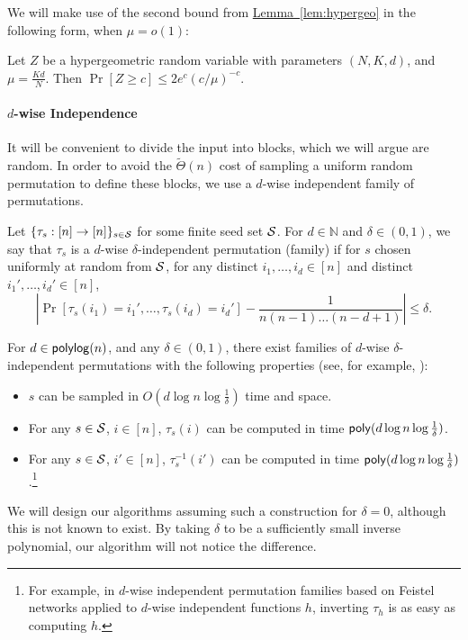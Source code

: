 \documentclass{theoretics}
\newcommand{\lem}[1]{\hyperref[lem:#1]{Lemma~\ref*{lem:#1}}}
\renewcommand{\>}{\rangle}
\newcommand{\<}{\langle}
\renewcommand{\(}{\left(}
\renewcommand{\)}{\right)}
\def\abs#1{\left| #1 \right|}
\begin{document}
\noindent We will make use of the second bound from \lem{hypergeo} in the following form, when $\mu=o(1)$:
\begin{corollary}\label{cor:hypergeo}
Let $Z$ be a hypergeometric random variable with parameters $(N,K,d)$, and $\mu=\frac{Kd}{N}$. Then $\Pr[Z\geq c]\leq 2e^c(c/\mu)^{-c}$. 
\end{corollary}


\paragraph{$d$-wise Independence} It will be convenient to divide the input into blocks, which we will argue are random. In order to avoid the $\widetilde{\Theta}(n)$ cost of sampling a uniform random permutation to define these blocks, we use a $d$-wise independent family of permutations.
\begin{definition}\label{def:d-wise}
Let $\{\tau_s:[n]\rightarrow[n]\}_{s\in {\cal S}}$ for some finite seed set ${\cal S}$. For $d\in \mathbb{N}$ and $\delta\in (0,1)$, we say that $\tau_s$ is a $d$-wise $\delta$-independent permutation (family) if for $s$ chosen uniformly at random from ${\cal S}$, for any distinct $i_1,\dots,i_d\in [n]$ and distinct $i_1',\dots,i_d'\in [n]$,
$$\abs{\Pr[\tau_s(i_1)=i_1',\dots,\tau_s(i_d)=i_d'] - \frac{1}{n(n-1)\dots (n-d+1)}}\leq \delta.$$
\end{definition}

For $d\in {\sf polylog}(n)$, and any $\delta \in (0,1)$, there exist families of $d$-wise $\delta$-independent permutations with the following properties (see, for example, \cite{kaplan2009derandomized}):
\begin{itemize}
\item $s$ can be sampled in $O(d\log n \log\frac{1}{\delta})$ time and space.
\item For any $s\in {\cal S}$, $i\in [n]$, $\tau_s(i)$ can be computed in time ${\sf poly}(d\log n\log\frac{1}{\delta})$.
\item For any $s\in {\cal S}$, $i'\in [n]$, $\tau_s^{-1}(i')$ can be computed in time ${\sf poly}(d\log n\log\frac{1}{\delta})$.\footnote{For example, in $d$-wise independent permutation families based on Feistel networks applied to $d$-wise independent functions $h$, inverting $\tau_h$ is as easy as computing $h$.}
\end{itemize}
We will design our algorithms assuming such a construction for $\delta=0$, although this is not known to exist. By taking $\delta$ to be a sufficiently small inverse polynomial, our algorithm will not notice the difference. 
\end{document}

